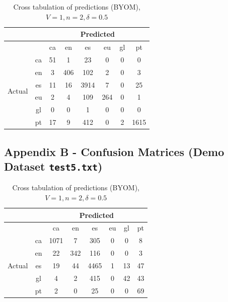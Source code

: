 \documentclass[runningheads]{llncs}
\newcommand{\code}[1]{\texttt{#1}}
\begin{document}
\begin{table}
	\centering
	\caption{Cross tabulation of predictions (BYOM), $V=1, n=2, \delta=0.5$}
	\begin{tabular}{|c|c|c|c|c|c|c|c|} \hline
		& & \multicolumn{6}{c|}{Predicted} \\ \hline
		& &  ca &   en &    es &   eu &  gl &    pt \\ \hline
		\multirow{6}{*}{Actual} & ca   &  51 &    1 &    23 &    0 &   0 &     0 \\
		& en   &   3 &  406 &   102 &    2 &   0 &     3 \\
		& es   &  11 &   16 &  3914 &    7 &   0 &    25 \\
		& eu   &   2 &    4 &   109 &  264 &   0 &     1 \\
		& gl   &   0 &    0 &     1 &    0 &   0 &     0 \\
		& pt   &  17 &    9 &   412 &    0 &   2 &  1615 \\ \hline
	\end{tabular}
\end{table}

\newpage

\subsection{Appendix B - Confusion Matrices (Demo Dataset \code{test5.txt})}









\begin{table}
	\centering
	\caption{Cross tabulation of predictions (BYOM), $V=1, n=2, \delta=0.5$}
		\begin{tabular}{|c|c|c|c|c|c|c|c|} \hline
		& & \multicolumn{6}{c|}{Predicted} \\ \hline
		& &  ca &   en &    es &  eu &  gl &  pt \\ \hline
		\multirow{6}{*}{Actual} & ca   &  1071 &    7 &   305 &   0 &   0 &   8 \\
		& en   &    22 &  342 &   116 &   0 &   0 &   3 \\
		& es   &    19 &   44 &  4465 &   1 &  13 &  47 \\
		& gl   &     4 &    2 &   415 &   0 &  42 &  43 \\
		& pt   &     2 &    0 &    25 &   0 &   0 &  69 \\ \hline
    \end{tabular}
\end{table}
\end{document}

